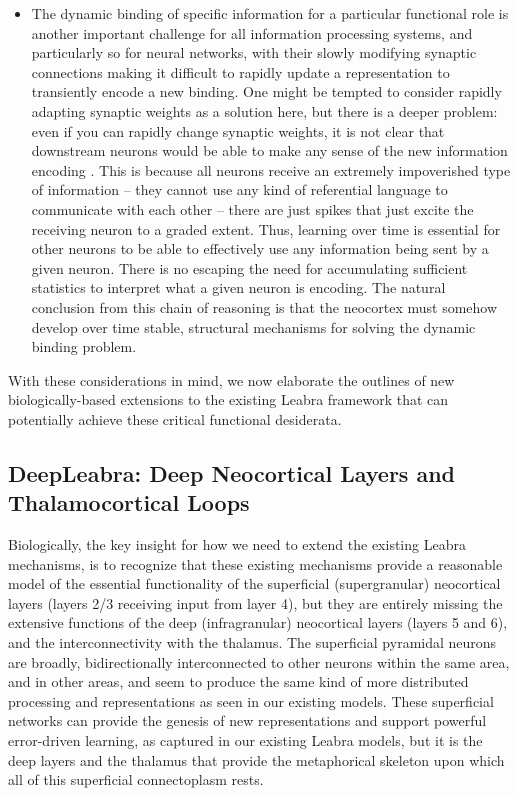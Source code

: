 \documentclass[11pt,twoside]{article}
\newif\myifpdf
\begin{document}
\begin{itemize}
\item The dynamic binding of specific information for a particular functional role is another important challenge for all information processing systems, and particularly so for neural networks, with their slowly modifying synaptic connections making it difficult to rapidly update a representation to transiently encode a new binding.  One might be tempted to consider rapidly adapting synaptic weights as a solution here, but there is a deeper problem: even if you can rapidly change synaptic weights, it is not clear that downstream neurons would be able to make any sense of the new information encoding \cite{OReilly10}.  This is because all neurons receive an extremely impoverished type of information -- they cannot use any kind of referential language to communicate with each other -- there are just spikes that just excite the receiving neuron to a graded extent.  Thus, learning over time is essential for other neurons to be able to effectively use any information being sent by a given neuron.  There is no escaping the need for accumulating sufficient statistics to interpret what a given neuron is encoding.  The natural conclusion from this chain of reasoning is that the neocortex must somehow develop over time stable, structural mechanisms for solving the dynamic binding problem.

\end{itemize}

With these considerations in mind, we now elaborate the outlines of new biologically-based extensions to the existing Leabra framework that can potentially achieve these critical functional desiderata.

\subsection{DeepLeabra: Deep Neocortical Layers and Thalamocortical Loops}

Biologically, the key insight for how we need to extend the existing Leabra mechanisms, is to recognize that these existing mechanisms provide a reasonable model of the essential functionality of the superficial (supergranular) neocortical layers (layers 2/3 receiving input from layer 4), but they are entirely missing the extensive functions of the deep (infragranular) neocortical layers (layers 5 and 6), and the interconnectivity with the thalamus.  The superficial pyramidal neurons are broadly, bidirectionally interconnected to other neurons within the same area, and in other areas, and seem to produce the same kind of more distributed processing and representations as seen in our existing models.  These superficial networks can provide the genesis of new representations and support powerful error-driven learning, as captured in our existing Leabra models, but it is the deep layers and the thalamus that provide the metaphorical skeleton upon which all of this superficial connectoplasm rests.
\end{document}
